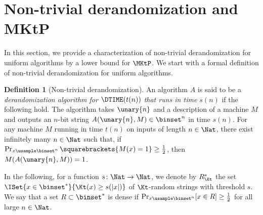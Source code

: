 \documentclass[11pt]{article}
\numberwithin{equation}{section}
\theoremstyle{definition}
\newtheorem{definition}[theorem]{Definition}
\theoremstyle{plain}
\begin{document}
\section{Non-trivial derandomization and MKtP}

In this section, we provide a characterization of non-trivial derandomization for uniform algorithms by
a lower bound for $\MKtP$.
We start with a formal definition of non-trivial derandomization for uniform algorithms.
%

\begin{definition}
  [Non-trivial derandomization]
  An algorithm $A$ is said to be
  a \emph{derandomization algorithm for $\DTIME(t(n))$ that runs in time $s(n)$}
  if the following hold.
  The algorithm takes $\unary{n}$ and a description of a machine $M$ and outputs an $n$-bit string $A(\unary{n}, M) \in \binset^n$
  in time $s(n)$.
  For any machine $M$ running in time $t(n)$ on inputs of length $n \in \Nat$,
  there exist infinitely many $n \in \Nat$ such that,
  if $\Pr_{x \usample \binset^n} \squarebrackets{ M(x) = 1 } \ge \frac{1}{2}$,
  then $M(A(\unary{n}, M)) = 1$.
\end{definition}

In the following, for a function $s \colon \Nat \to \Nat$, we denote by $R_\Kt^s$ the set $\ISet{ x \in \binset^* }{ \Kt(x) \ge s(|x|) }$
of $\Kt$-random strings with threshold $s$.
We say that a set $R \subset \binset^*$ is dense if $\Pr_{x \usample \binset^n} [ x \in R ] \ge \frac{1}{2}$ for all large $n \in \Nat$.
\end{document}
